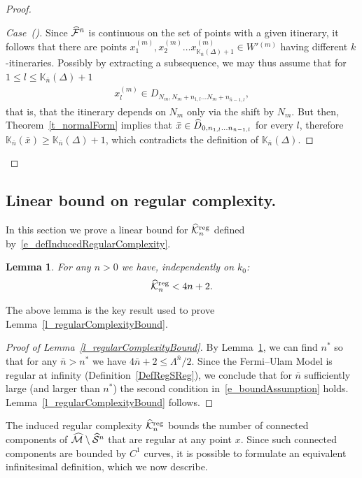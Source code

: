 \documentclass[10pt]{amsart}
\newtheorem{lemm}[theo]{Lemma}\newtheorem{prop}[theo]{Proposition}\newtheorem{coro}[theo]{Corollary}\newtheorem{conj}[theo]{Conjecture}
\theoremstyle{definition}\newtheorem{defi}[theo]{Definition}\newtheorem{rema}[theo]{Remark}\newtheorem{exam}[theo]{Example}\newtheorem{exem}[theo]{Example}\newtheorem{nota}[theo]{Notation}
\newcommand{\LC}{\mathbb{K}}
\newcommand{\cm}{\mathcal{F}}
\newcommand{\csp}{\mathcal{M}}
\newcommand{\cmp}{\hat\cm}
\newcommand{\cspi}{\widehat{\csp}}
\newcommand{\brx}{\bar{x}}
\newcommand{\singPrivate}{\mathcal{S}}
\newcommand{\singp}[1]{\hat{\singPrivate}^{#1}}
\newcommand{\xseq}[1]{\privSeq x{#1}}
\newcommand{\ckregp}{\hat{\mathcal{K}}^\text{reg}}
\newcommand{\privSeq}[2]{#1^{(#2)}}
\newcommand{\Wpseq}[1]{\privSeq{W'{}}{#1}}
\newcommand{\hDom}{\hat D}
\newcounter{casecount}
\renewcommand*\thecasecount{(\alph{casecount})}
\newenvironment{case}{\refstepcounter{casecount}\begin{proof}[{Case~\thecasecount}]}{\let\qed\relax\end{proof}}
\let\oldhat\hat
\renewcommand*{\hat}[1]{\mathchoice{\widehat{#1}}{\widehat{#1}}{\oldhat{#1}}{\oldhat{#1}}}
\begin{document}
\begin{proof}
\begin{case}
Since $\cmp^{\bar n}$ is continuous on the set of points with a given itinerary, it follows that there are points $\xseq{m}_1, \xseq{m}_2\dots \xseq{m}_{\LC_{\bar n}(\Delta)+1}\in
\Wpseq{m}$ having different $k$-itineraries. Possibly by extracting a subsequence, we may thus assume that for $1\le l\le\LC_{\bar n}(\Delta)+1$
\begin{align*}
\xseq{m}_{l}\in D_{N_m, N_m+n_{1,l}\dots N_m+n_{\bar n-1,l}},
\end{align*}
that is, that the itinerary depends on $N_m$ only via the shift by $N_m$. But then, Theorem~\ref{t_normalForm} implies that $\brx\in \hDom_{0, n_{1,l}\dots n_{\bar n-1,l}}$ for every $l$, therefore $\LC_{\bar n}(\brx)\geq \LC_{\bar n}(\Delta)+1$, which contradicts the definition of $\LC_{\bar n}(\Delta)$.\qedhere
\end{case}\let\qed\relax
\end{proof}



\subsection{Linear bound on regular complexity.}\label{SSPointwise}

In this section we prove a linear bound for $\ckregp_n$ defined by~\eqref{e_defInducedRegularComplexity}.

\begin{lemm}\label{l_actualInducedComplexityBound}
For any $n > 0$ we have, independently on $k_{0}$:
\begin{align}\label{e_actualInducedComplexityBound}
\ckregp_n < 4n + 2.
\end{align}
\end{lemm} 

The above lemma is the key result used to prove Lemma~\ref{l_regularComplexityBound}.

\begin{proof}[Proof of Lemma~\ref{l_regularComplexityBound}]
By Lemma~\ref{l_actualInducedComplexityBound}, we can find $n^{*}$ so that for any $\bar n > n^*$ we have $4\bar n+2\leq \Lambda^{\bar n}/2$. Since the Fermi--Ulam Model is regular at infinity (Definition~\ref{DefRegSReg}), we conclude that for $\bar n$ sufficiently large (and larger than $n^{*}$) the second condition in~\eqref{e_boundAssumption} holds. Lemma~\ref{l_regularComplexityBound} follows.
\end{proof}

The induced regular complexity $\ckregp_n$ bounds the number of connected components of $\cspi\setminus\singp{n}$ that are regular at any point $x$. Since such connected components are bounded by $C^{1}$ curves, it is possible to formulate an equivalent infinitesimal definition, which we now describe.
\end{document}
